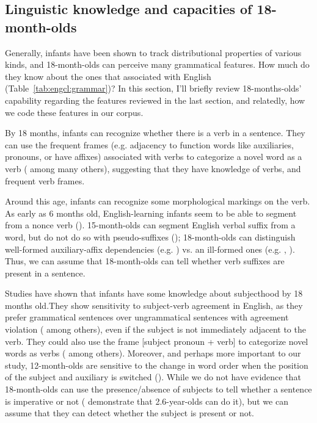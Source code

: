 \subsection{Linguistic knowledge and capacities of 18-month-olds}
\label{sec:engcl:bg:assumptions}

Generally, infants have been shown to track distributional properties of various kinds, and 18-month-olds can perceive many grammatical features. How much do they know about the ones that associated with English \diis{} (Table~\ref{tab:engcl:grammar})? In this section, I'll briefly review 18-months-olds' capability regarding the features reviewed in the last section, and relatedly, how we code these features in our corpus. %

 By 18 months, infants can recognize whether there is a verb in a sentence. They can use the frequent frames (e.g. adjacency to function words like auxiliaries, pronouns, or have affixes) associated with verbs to categorize a novel word as a verb (\cite{echols2004verb, mintz2006verb,peterson2006aux,soderstrom2007sv, lidzoritaomaki2012, shi2014functional, helidz2017verb} among many others), suggesting that they have knowledge of verbs, and frequent verb frames. 

 Around this age, infants can recognize some morphological markings on the verb.  As early as 6 months old, English-learning infants seem to be able to segment  from a nonce verb (\cite{kimmegha2016morph}). 15-month-olds can segment English verbal suffix  from a word, but do not do so with pseudo-suffixes (\cite{mintz2013segmentation}); 18-month-olds can distinguish well-formed auxiliary-affix dependencies (e.g. ) vs. an ill-formed ones (e.g. , \cite{santelmann1998morph}). Thus, we can assume that 18-month-olds can tell whether verb suffixes are present in a sentence.

 Studies have shown that infants have some knowledge about subjecthood by 18 months old.They show sensitivity to subject-verb agreement in English, as they prefer grammatical sentences over ungrammatical sentences with agreement violation (\cite{soderstrom2002agr, soderstrom2007sv, nazzi2011} among others), even if the subject is not immediately adjacent to the verb. They could also use the frame [subject pronoun + verb] to categorize novel words as verbs (\cite{babineau202014func,peterson2006aux, mintz2006verb,shi2014functional} among others). Moreover, and perhaps more important to our study, 12-month-olds are sensitive to the change in word order when the position of the subject and auxiliary is switched (\cite{geffenmintz2015wordorder}). While we do not have evidence that 18-month-olds can use the presence/absence of subjects to tell whether a sentence is imperative or not (\cite{orfitellihyams2012subj} demonstrate that 2.6-year-olds can do it), but we can assume that they can detect whether the subject is present or not.  %


